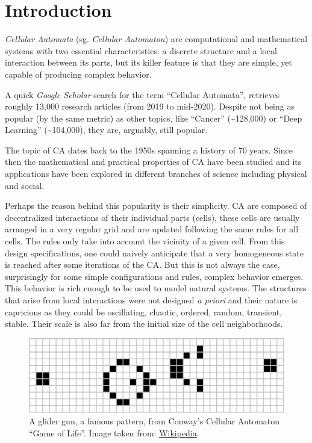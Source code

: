 \documentclass[
  12pt,
  openany]{book}
\begin{document}
\hypertarget{introduction-1}{%
\section{Introduction}\label{introduction-1}}

\emph{Cellular Automata} (sg. \emph{Cellular Automaton}) are computational and mathematical systems with two essential characteristics: a discrete structure and a local interaction between its parts, but its killer feature is that they are simple, yet capable of producing complex behavior.

A quick \emph{Google Scholar} search for the term ``Cellular Automata'', retrieves roughly 13,000 research articles (from 2019 to mid-2020). Despite not being as popular (by the same metric) as other topics, like ``Cancer'' (\textasciitilde128,000) or ``Deep Learning'' (\textasciitilde104,000), they are, arguably, still popular.

The topic of CA dates back to the 1950s spanning a history of 70 years. Since then the mathematical and practical properties of CA have been studied and its applications have been explored in different branches of science including physical and social.

Perhaps the reason behind this popularity is their simplicity. CA are composed of decentralized interactions of their individual parts (cells), these cells are usually arranged in a very regular grid and are updated following the same rules for all cells. The rules only take into account the vicinity of a given cell. From this design specifications, one could naively anticipate that a very homogeneous state is reached after some iterations of the CA. But this is not always the case, surprisingly for some simple configurations and rules, complex behavior emerges. This behavior is rich enough to be used to model natural systems. The structures that arise from local interactions were not designed \emph{a priori} and their nature is capricious as they could be oscillating, chaotic, ordered, random, transient, stable. Their scale is also far from the initial size of the cell neighborhoods.



\begin{figure}

{\centering \includegraphics[width=0.8\linewidth]{pics/Game_of_life_glider_gun} 

}

\caption{A glider gun, a famous pattern, from Conway's Cellular Automaton ``Game of Life''. Image taken from: \href{https://en.wikipedia.org/wiki/File:Game_of_life_glider_gun.svg}{Wikipedia}.}\label{fig:CA-example}
\end{figure}
\end{document}
